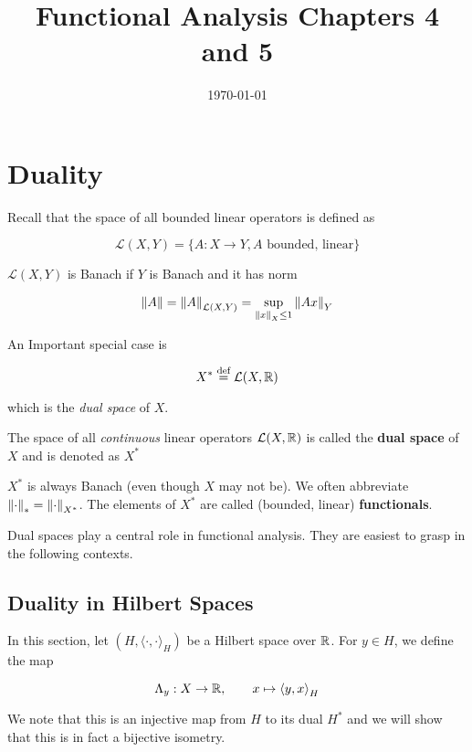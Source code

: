 \documentclass{article}
\title{Functional Analysis Chapters 4 and 5}
\date{\today}
\begin{document}
\maketitle

\section{Duality}

Recall that the space of all bounded linear operators is defined as

\[
	\mathcal{L}(X,Y) = \{A: X \to Y, A \textrm{ bounded, linear}\}
\]

\(\mathcal{L}(X,Y)\) is Banach if  \(Y\) is Banach and it has norm

\[
	\left\|{A}\right\| = \left\|{A}\right\|_{\mathcal{L}(X,Y)} = \sup_{\left\|{x}\right\|_X \leq 1} \left\|{Ax}\right\|_Y
\]

An Important special case is

\[
	X^* \overset{\textrm{def}}{=} \mathcal{L}(X,\mathbb{R})
\]

which is the \textit{dual space} of  \(X\).

\begin{definition}\nextline
	The space of all \textit{continuous} linear operators  \(\mathcal{L}(X, \mathbb{R})\) is called the \textbf{dual space} of  \(X\) and is denoted as   \(X^*\)
\end{definition}

\begin{remark}
	\(X^*\) is always Banach (even though  \(X\) may not be). We often abbreviate  \(\left\|{\cdot}\right\|_* = \left\|{\cdot}\right\|_{X^*}\). The elements of  \(X^*\) are called (bounded, linear) \textbf{functionals}.
\end{remark}

Dual spaces play a central role in functional analysis. They are easiest to grasp in the following contexts.

\subsection{Duality in Hilbert Spaces}
In this section, let  \((H, {\langle \cdot, \cdot \rangle}_H )\) be a Hilbert space over  \(\mathbb{R}\). For  \(y\in H\), we define the map

\begin{equation*}
	\Lambda_y: X \to \mathbb{R}, \qquad x \mapsto {\langle y, x \rangle}_H
\end{equation*}

We note that this is an injective map from  \(H\) to its dual  \(H^*\) and we will show that this is in fact a bijective isometry.
\end{document}
